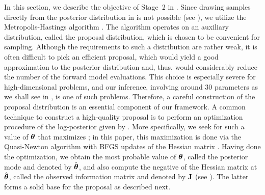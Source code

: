 In this section, we describe the objective of Stage~2 in .
Since drawing samples directly from the posterior distribution in  is not possible (see ), we utilize the Metropolis-Hastings algorithm \cite{gelman2004}.
The algorithm operates on an auxiliary distribution, called the proposal distribution, which is chosen to be convenient for sampling.
Although the requirements to such a distribution are rather weak, it is often difficult to pick an efficient proposal, which would yield a good approximation to the posterior distribution and, thus, would considerably reduce the number of the forward model evaluations.
This choice is especially severe for high-dimensional problems, and our inference, involving around 30 parameters as we shall see in , is one of such problems.
Therefore, a careful construction of the proposal distribution is an essential component of our framework.
A common technique to construct a high-quality proposal is to perform an optimization procedure of the log-posterior given by .
More specifically, we seek for such a value of ${\boldsymbol\theta}$ that maximizes ; in this paper, this maximization is done via the Quasi-Newton algorithm with BFGS updates of the Hessian matrix \cite{press2007}.
Having done the optimization, we obtain the most probable value of ${\boldsymbol\theta}$, called the posterior mode and denoted by $\hat{{\boldsymbol\theta}}$, and also compute the negative of the Hessian matrix at $\hat{{\boldsymbol\theta}}$, called the observed information matrix and denoted by $\mathbf{J}$ (see ).
The latter forms a solid base for the proposal as described next.
